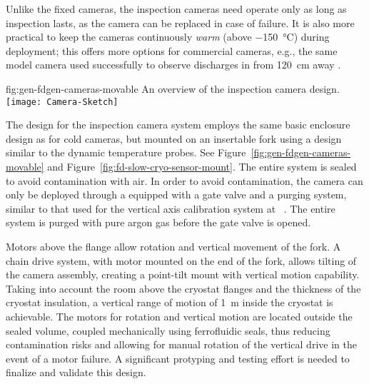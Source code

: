 Unlike the fixed cameras, the inspection cameras need operate only as
long as inspection lasts, as the camera can be replaced in case of failure.  It
is also more practical to keep the cameras continuously \textit{warm}
(above \SI{-150}{\celsius}) during deployment; this offers %
more options for commercial cameras, e.g., %
the same model camera used successfully to observe discharges
in \lar from \SI{120}{cm} away \cite{Auger:2015xlo}.

\begin{dunefigure}{fig:gen-fdgen-cameras-movable}
  {An overview of the inspection camera design.}
  \texttt{[image: Camera-Sketch]}%
\end{dunefigure}

The design for the inspection camera system employs the same basic
enclosure design as for cold cameras, but mounted on an insertable
fork using a design similar to the dynamic temperature probes. See
Figure~\ref{fig:gen-fdgen-cameras-movable} and
Figure~\ref{fig:fd-slow-cryo-sensor-mount}.  The entire system is sealed to
avoid contamination with air. In order to avoid contamination, the
camera can only be deployed through a \fdth equipped with a gate
valve and a purging system, similar to that used for the vertical axis
calibration system at \kamland~\cite{Banks:2014hra}. The entire system
is  purged with pure argon gas before the gate valve is opened.

Motors above the flange allow rotation and vertical movement of the fork. 
 A chain drive system, with motor
mounted on the end of the fork, allows tilting of the camera assembly, 
creating a point-tilt mount with vertical motion capability.
Taking into account the room above the cryostat flanges and the
thickness of the cryostat insulation, a vertical range of motion of
\SI{1}{m} inside the cryostat is achievable.
The motors for rotation and vertical motion are located outside the sealed
volume, coupled mechanically using ferrofluidic seals, thus reducing
contamination risks and allowing for manual rotation of the vertical
drive in the event of a motor failure.  A significant protyping and
testing effort is needed to finalize and validate this design.

